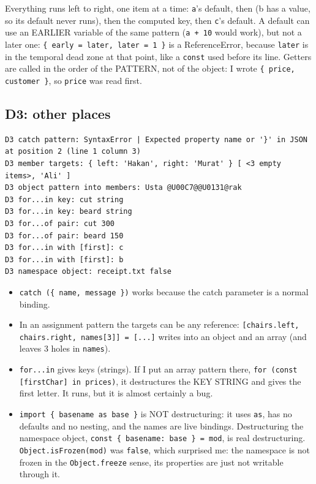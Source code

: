 Everything runs left to right, one item at a time: \passthrough{\lstinline!a!}'s default, then (b has a value, so its default never runs), then the computed key,
then \passthrough{\lstinline!c!}'s default. A default can use an EARLIER variable of the same pattern (\passthrough{\lstinline!a + 10!} would work), but not a later one:
\passthrough{\lstinline!\{ early = later, later = 1 \}!} is a ReferenceError, because \passthrough{\lstinline!later!} is in the temporal dead zone at that point, like a \passthrough{\lstinline!const!} used before its line.
Getters are called in the order of the PATTERN, not of the object: I wrote \passthrough{\lstinline!\{ price, customer \}!}, so \passthrough{\lstinline!price!} was read first.

\subsection{D3: other places}\label{d3-other-places}

\begin{lstlisting}
D3 catch pattern: SyntaxError | Expected property name or '}' in JSON at position 2 (line 1 column 3)
D3 member targets: { left: 'Hakan', right: 'Murat' } [ <3 empty items>, 'Ali' ]
D3 object pattern into members: Usta @U00C7@@U0131@rak
D3 for...in key: cut string
D3 for...in key: beard string
D3 for...of pair: cut 300
D3 for...of pair: beard 150
D3 for...in with [first]: c
D3 for...in with [first]: b
D3 namespace object: receipt.txt false
\end{lstlisting}

\begin{itemize}
\tightlist
\item
  \passthrough{\lstinline!catch (\{ name, message \})!} works because the catch parameter is a normal binding.
\item
  In an assignment pattern the targets can be any reference: \passthrough{\lstinline![chairs.left, chairs.right, names[3]] = [...]!} writes into an object and an array (and leaves 3 holes in \passthrough{\lstinline!names!}).
\item
  \passthrough{\lstinline!for...in!} gives keys (strings). If I put an array pattern there, \passthrough{\lstinline!for (const [firstChar] in prices)!}, it destructures the KEY STRING and gives the first letter. It runs, but it is almost certainly a bug.
\item
  \passthrough{\lstinline!import \{ basename as base \}!} is NOT destructuring: it uses \passthrough{\lstinline!as!}, has no defaults and no nesting, and the names are live bindings. Destructuring the namespace object, \passthrough{\lstinline!const \{ basename: base \} = mod!}, is real destructuring. \passthrough{\lstinline!Object.isFrozen(mod)!} was \passthrough{\lstinline!false!}, which surprised me: the namespace is not frozen in the \passthrough{\lstinline!Object.freeze!} sense, its properties are just not writable through it.
\end{itemize}

